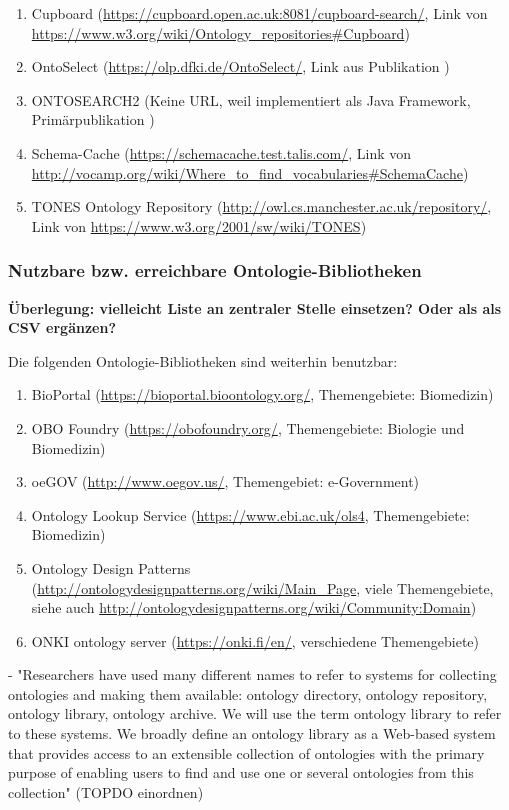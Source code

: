 \documentclass{article}
\begin{document}
\begin{enumerate}
    \item Cupboard (\url{https://cupboard.open.ac.uk:8081/cupboard-search/}, Link von \url{https://www.w3.org/wiki/Ontology_repositories\#Cupboard})
    \item OntoSelect (\url{https://olp.dfki.de/OntoSelect/}, Link aus Publikation \cite{buitelaar2008ontology})
    \item ONTOSEARCH2 (Keine URL, weil implementiert als Java Framework, Primärpublikation \cite{pan2006ontosearch2})
    \item Schema-Cache (\url{https://schemacache.test.talis.com/}, Link von \url{http://vocamp.org/wiki/Where_to_find_vocabularies\#SchemaCache})
    \item TONES Ontology Repository (\url{http://owl.cs.manchester.ac.uk/repository/}, Link von \url{https://www.w3.org/2001/sw/wiki/TONES})
\end{enumerate}

\subsubsection{Nutzbare bzw. erreichbare Ontologie-Bibliotheken}

\textbf{Überlegung: vielleicht Liste an zentraler Stelle einsetzen? Oder als als CSV ergänzen?}

Die folgenden Ontologie-Bibliotheken sind weiterhin benutzbar:

\begin{enumerate}
    \item BioPortal (\url{https://bioportal.bioontology.org/}, Themengebiete: Biomedizin)
    \item OBO Foundry (\url{https://obofoundry.org/}, Themengebiete: Biologie und Biomedizin)
    \item oeGOV (\url{http://www.oegov.us/}, Themengebiet: e-Government)
    \item Ontology Lookup Service (\url{https://www.ebi.ac.uk/ols4}, Themengebiete: Biomedizin)
    \item Ontology Design Patterns (\url{http://ontologydesignpatterns.org/wiki/Main\_Page}, viele Themengebiete, siehe auch \url{http://ontologydesignpatterns.org/wiki/Community:Domain})
    \item ONKI ontology server (\url{https://onki.fi/en/}, verschiedene Themengebiete)
\end{enumerate}


- "Researchers have used many different names to refer to systems for collecting ontologies
and making them available: ontology directory, ontology repository, ontology library,
ontology archive. We will use the term ontology library to refer to these systems. We
broadly define an ontology library as a Web-based system that provides access to an
extensible collection of ontologies with the primary purpose of enabling users to find and
use one or several ontologies from this collection" (TOPDO einordnen)
\end{document}
